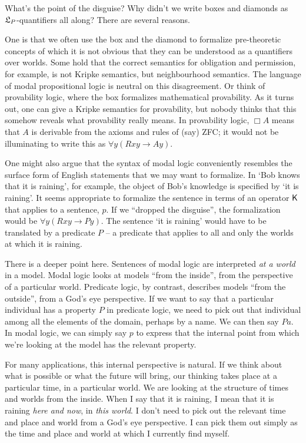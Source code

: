 What's the point of the disguise? Why didn't we write boxes and diamonds as
$\mathfrak{L}_P$-quantifiers all along? There are several reasons.

One is that we often use the box and the diamond to formalize pre-theoretic
concepts of which it is not obvious that they can be understood as a quantifiers
over worlds. Some hold that the correct semantics for obligation and permission,
for example, is not Kripke semantics, but neighbourhood semantics. The language
of modal propositional logic is neutral on this disagreement. Or think of
provability logic, where the box formalizes mathematical provability. As it
turns out, one can give a Kripke semantics for provability, but nobody thinks
that this somehow reveals what provability really means. In provability logic,
$\Box A$ means that $A$ is derivable from the axioms and rules of (say) ZFC; it
would not be illuminating to write this as $\forall y(Rxy \to Ay)$.

One might also argue that the syntax of modal logic conveniently resembles the
surface form of English statements that we may want to formalize. In `Bob knows
that it is raining', for example, the object of Bob's knowledge is specified by
`it is raining'. It seems appropriate to formalize the sentence in terms of an
operator $\operatorname{\mathsf{K}{}}$ that applies to a sentence, $p$. If we ``dropped the disguise'',
the formalization would be $\forall y(Rxy \to Py)$. The sentence `it is raining'
would have to be translated by a predicate $P$ -- a predicate that applies to
all and only the worlds at which it is raining.

There is a deeper point here. Sentences of modal logic are interpreted \emph{at
  a world} in a model. Modal logic looks at models ``from the inside'', from the
perspective of a particular world. Predicate logic, by contrast, describes
models ``from the outside'', from a God's eye perspective. If we want to say
that a particular individual has a property $P$ in predicate logic, we need to
pick out that individual among all the elements of the domain, perhaps by a
name. We can then say $Pa$. In modal logic, we can simply say $p$ to express
that the internal point from which we're looking at the model has the relevant
property.

For many applications, this internal perspective is natural. If we think
about what is possible or  what the future will bring, our thinking takes
place at a particular time, in a particular world. We are looking at the
structure of times and worlds from the inside. When I say that it is raining, I
mean that it is raining \emph{here and now}, in \emph{this world}. I don't need
to pick out the relevant time and place and world from a God's eye perspective.
I can pick them out simply as the time and place and world at which I currently
find myself.

